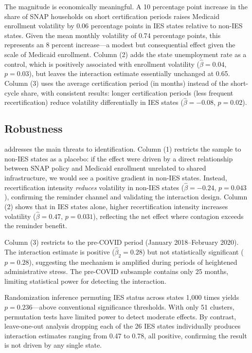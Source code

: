 \documentclass[12pt]{article}
\begin{document}
The magnitude is economically meaningful. A 10 percentage point increase in the share of SNAP households on short certification periods raises Medicaid enrollment volatility by 0.06 percentage points in IES states relative to non-IES states. Given the mean monthly volatility of 0.74 percentage points, this represents an 8 percent increase---a modest but consequential effect given the scale of Medicaid enrollment. Column (2) adds the state unemployment rate as a control, which is positively associated with enrollment volatility ($\hat{\beta} = 0.04$, $p = 0.03$), but leaves the interaction estimate essentially unchanged at 0.65. Column (3) uses the average certification period (in months) instead of the short-cycle share, with consistent results: longer certification periods (less frequent recertification) reduce volatility differentially in IES states ($\hat{\beta} = -0.08$, $p = 0.02$).


\subsection{Robustness}



 addresses the main threats to identification. Column (1) restricts the sample to non-IES states as a placebo: if the effect were driven by a direct relationship between SNAP policy and Medicaid enrollment unrelated to shared infrastructure, we would see a positive gradient in non-IES states. Instead, recertification intensity \textit{reduces} volatility in non-IES states ($\hat{\beta} = -0.24$, $p = 0.043$), confirming the reminder channel and validating the interaction design. Column (2) shows that in IES states alone, higher recertification intensity increases volatility ($\hat{\beta} = 0.47$, $p = 0.031$), reflecting the net effect where contagion exceeds the reminder benefit.

Column (3) restricts to the pre-COVID period (January 2018--February 2020). The interaction estimate is positive ($\hat{\beta}_2 = 0.28$) but not statistically significant ($p = 0.28$), suggesting the mechanism is amplified during periods of heightened administrative stress. The pre-COVID subsample contains only 25 months, limiting statistical power for detecting the interaction.

Randomization inference permuting IES status across states 1,000 times yields $p = 0.236$---above conventional significance thresholds. With only 51 clusters, permutation tests have limited power to detect moderate effects. By contrast, leave-one-out analysis dropping each of the 26 IES states individually produces interaction estimates ranging from 0.47 to 0.78, all positive, confirming the result is not driven by any single state.
\end{document}
